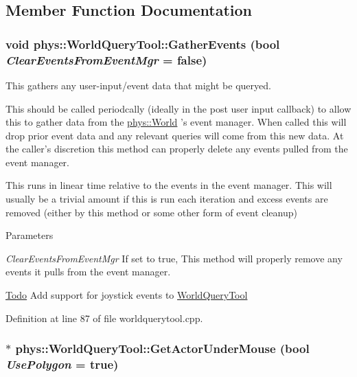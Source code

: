 \subsection{Member Function Documentation}
\hypertarget{classphys_1_1WorldQueryTool_ae387ff047f3cdf408d8959b8cbf4cc57}{
\subsubsection[{GatherEvents}]{\setlength{\rightskip}{0pt plus 5cm}void phys::WorldQueryTool::GatherEvents (bool {\em ClearEventsFromEventMgr} = {\ttfamily false})}}
\label{d8/d69/classphys_1_1WorldQueryTool_ae387ff047f3cdf408d8959b8cbf4cc57}


This gathers any user-\/input/event data that might be queryed. 

This should be called periodcally (ideally in the post user input callback) to allow this to gather data from the \hyperlink{classphys_1_1World}{phys::World} 's event manager. When called this will drop prior event data and any relevant queries will come from this new data. At the caller's discretion this method can properly delete any events pulled from the event manager. \par
 \par
 This runs in linear time relative to the events in the event manager. This will usually be a trivial amount if this is run each iteration and excess events are removed (either by this method or some other form of event cleanup) 
\begin{DoxyParams}{Parameters}
\item[{\em ClearEventsFromEventMgr}]If set to true, This method will properly remove any events it pulls from the event manager. \end{DoxyParams}


\begin{Desc}
\item[\hyperlink{todo__todo000021}{Todo}]Add support for joystick events to \hyperlink{classphys_1_1WorldQueryTool}{WorldQueryTool} \end{Desc}




Definition at line 87 of file worldquerytool.cpp.

\hypertarget{classphys_1_1WorldQueryTool_a3ee3394dccd1d1c844e346ec78ad1fa9}{
\subsubsection[{GetActorUnderMouse}]{$\ast$ phys::WorldQueryTool::GetActorUnderMouse (bool {\em UsePolygon} = {\ttfamily true})}}
\label{d8/d69/classphys_1_1WorldQueryTool_a3ee3394dccd1d1c844e346ec78ad1fa9}

